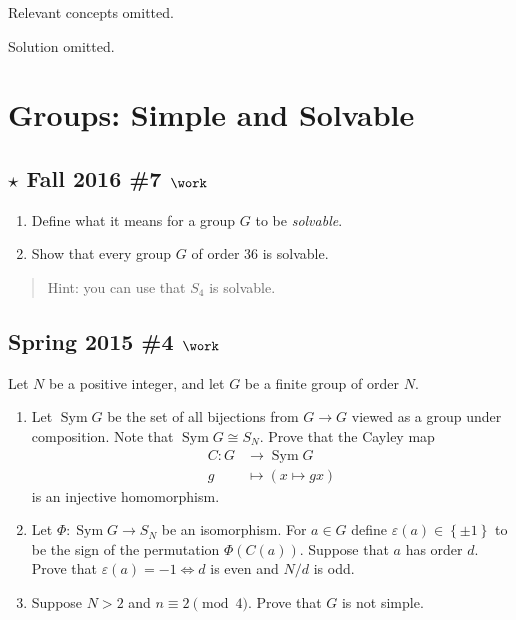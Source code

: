 Relevant concepts omitted.

Solution omitted.

\hypertarget{groups-simple-and-solvable}{%
\section{Groups: Simple and Solvable}\label{groups-simple-and-solvable}}

\hypertarget{star-fall-2016-7-work}{%
\subsection{\texorpdfstring{\(\star\) Fall 2016 \#7
\(\work\)}{\textbackslash star Fall 2016 \#7 \textbackslash work}}\label{star-fall-2016-7-work}}

\begin{enumerate}
\def\labelenumi{\alph{enumi}.}
\item
  Define what it means for a group \(G\) to be \emph{solvable}.
\item
  Show that every group \(G\) of order 36 is solvable.
\end{enumerate}

\begin{quote}
Hint: you can use that \(S_4\) is solvable.
\end{quote}

\hypertarget{spring-2015-4-work}{%
\subsection{\texorpdfstring{Spring 2015 \#4
\(\work\)}{Spring 2015 \#4 \textbackslash work}}\label{spring-2015-4-work}}

Let \(N\) be a positive integer, and let \(G\) be a finite group of
order \(N\).

\begin{enumerate}
\def\labelenumi{\alph{enumi}.}
\item
  Let \(\operatorname{Sym}G\) be the set of all bijections from
  \(G\to G\) viewed as a group under composition. Note that
  \(\operatorname{Sym}G \cong S_N\). Prove that the Cayley map
  \begin{align*}
  C: G&\to \operatorname{Sym}G\\
  g &\mapsto (x\mapsto gx)
  \end{align*}
  is an injective homomorphism.
\item
  Let \(\Phi: \operatorname{Sym}G\to S_N\) be an isomorphism. For
  \(a\in G\) define \(\varepsilon(a) \in \left\{{\pm 1}\right\}\) to be
  the sign of the permutation \(\Phi(C(a))\). Suppose that \(a\) has
  order \(d\). Prove that \(\varepsilon(a) = -1 \iff d\) is even and
  \(N/d\) is odd.
\item
  Suppose \(N> 2\) and \(n\equiv 2 \pmod 4\). Prove that \(G\) is not
  simple.
\end{enumerate}

